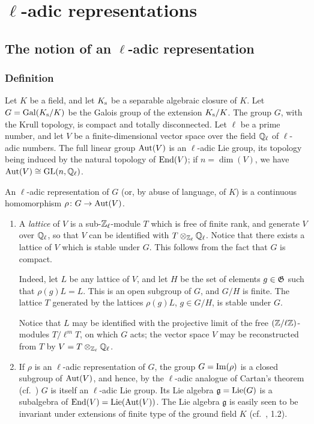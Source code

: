 \chapter{\texorpdfstring{$\ell$}{l}-adic representations}%
\label{ch:i}

\section{The notion of an \texorpdfstring{$\ell$}{l}-adic representation}
\subsection{Definition}\label{sec:I_11}
Let $K$ be a field,
\dpage
and let $K_{\mathrm{s}}$ be a separable algebraic closure of $K$.  Let $G =
\operatorname{Gal}(K_{\mathrm{s}} / K)$ be the Galois group of the extension $K_{\mathrm{s}}/K$.
The group $G$, with the Krull topology, is compact and totally disconnected.
Let $\ell$ be a prime number, and let $V$ be a finite-dimensional vector space
over the field $\mathbb{Q}_\ell$ of $\ell$-adic numbers.  The full linear group
$\operatorname{Aut}(V)$ is an $\ell$-adic Lie group, its topology being induced by the
natural topology of $\operatorname{End}(V)$; if $n = \dim(V)$, we have $\operatorname{Aut}(V) \cong \operatorname{GL}(n,
\mathbb{Q}_\ell)$.

\begin{mydef}
An $\ell$-adic representation of $G$ (or, by abuse of language, of $K$) is a
continuous homomorphism $\rho \colon G \to \operatorname{Aut}(V)$.
\end{mydef}

\begin{obs}
\begin{enumerate}
\item\label{rmk:I_11_1}
	A \emph{lattice} of $V$ is a sub-$\mathbb{Z}_\ell$-module $T$ which is free of
	finite rank, and generate $V$ over $\mathbb{Q}_\ell$, so that $V$ can be
	identified with $T \otimes_{\mathbb{Z}_\ell} \mathbb{Q}_\ell$.  Notice that there
	exists a lattice of $V$ which is stable under $G$. This follows from
	the fact that $G$ is compact.

	Indeed,
	\dpage
	let $L$ be any lattice of $V$, and let $H$ be the set of
	elements $g \in \mathfrak{G}$ such that $\rho(g)L = L$. This is an open
	subgroup of $G$, and $G/H$ is finite. The lattice $T$
	generated by the lattices $\rho(g)L$, $g \in G/H$, is stable
	under $G$.

	Notice that $L$ may be identified with the projective limit of
	the free $(\mathbb{Z}/\ell\mathbb{Z})$-modules $T/\ell^m T$, on which $G$
	acts; the vector space $V$ may be reconstructed from $T$ by $V
	= T \otimes_{\mathbb{Z}_\ell} \mathbb{Q}_\ell$.

\item If $\rho$ is an $\ell$-adic representation of $G$, the group $G
	= \operatorname{Im}(\rho)$ is a closed subgroup of $\operatorname{Aut}(V)$, and hence, by
	the $\ell$-adic analogue of Cartan's theorem (cf.\ 
	\cite[5-42]{28}) $G$ is itself an $\ell$-adic Lie group.
	Its Lie algebra $\mathfrak{g} = \operatorname{Lie}(G)$ is a subalgebra of
	$\operatorname{End}(V) = \operatorname{Lie}(\operatorname{Aut}(V))$. The Lie algebra $\mathfrak{g}$ is
	easily seen to be invariant under extensions of finite type of
	the ground field $K$ (cf.\ \cite{24}, 1.2).
\end{enumerate}
\end{obs}

